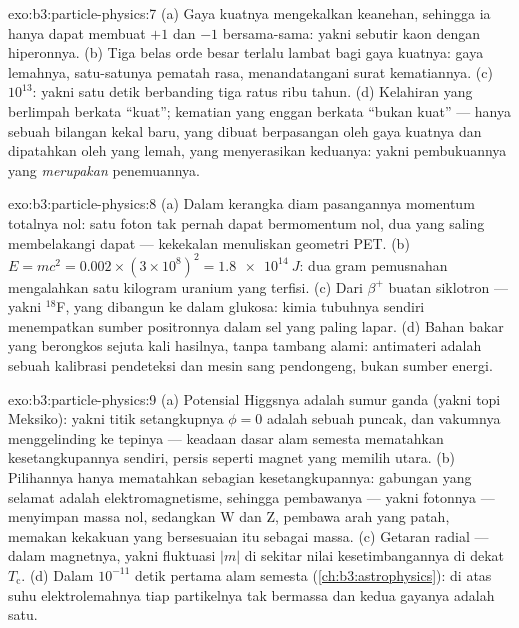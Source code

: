 \begin{solution}{exo:b3:particle-physics:7}
(a) Gaya kuatnya mengekalkan keanehan, sehingga ia hanya dapat membuat
$+1$ dan $-1$ bersama-sama: yakni sebutir kaon dengan hiperonnya. (b) Tiga belas
orde besar terlalu lambat bagi gaya kuatnya: gaya
lemahnya, satu-satunya pematah rasa, menandatangani surat kematiannya.
(c) $10^{13}$: yakni satu detik berbanding tiga ratus ribu tahun.
(d) Kelahiran yang berlimpah berkata ``kuat''; kematian yang enggan berkata ``bukan
kuat'' --- hanya sebuah bilangan kekal baru, yang dibuat berpasangan oleh gaya
kuatnya dan dipatahkan oleh yang lemah, yang menyerasikan keduanya: yakni
pembukuannya yang \emph{merupakan} penemuannya.
\end{solution}

\begin{solution}{exo:b3:particle-physics:8}
(a) Dalam kerangka diam pasangannya momentum totalnya nol: satu
foton tak pernah dapat bermomentum nol, dua yang saling membelakangi dapat ---
kekekalan menuliskan geometri PET. (b) $E = mc^2 =
0.002\times(3\times10^8)^2 = \qty{1.8e14}{J}$: dua gram
pemusnahan mengalahkan satu kilogram uranium yang terfisi. (c) Dari
 $\beta^+$ buatan siklotron --- yakni $^{18}$F, yang dibangun ke dalam
glukosa: kimia tubuhnya sendiri menempatkan sumber positronnya dalam
sel yang paling lapar. (d) Bahan bakar yang berongkos sejuta kali
hasilnya, tanpa tambang alami: antimateri adalah sebuah kalibrasi
pendeteksi dan mesin sang pendongeng, bukan sumber energi.
\end{solution}

\begin{solution}{exo:b3:particle-physics:9}
(a) Potensial Higgsnya adalah sumur ganda (yakni topi Meksiko): yakni
titik setangkupnya $\phi = 0$ adalah sebuah puncak, dan vakumnya menggelinding
ke tepinya --- keadaan dasar alam semesta mematahkan kesetangkupannya
sendiri, persis seperti magnet yang memilih utara. (b) Pilihannya
hanya mematahkan sebagian kesetangkupannya: gabungan yang selamat
adalah elektromagnetisme, sehingga pembawanya --- yakni fotonnya --- menyimpan
massa nol, sedangkan W dan Z, pembawa arah yang patah,
memakan kekakuan yang bersesuaian itu sebagai massa. (c) Getaran radial
 --- dalam magnetnya, yakni
fluktuasi $|m|$ di sekitar nilai kesetimbangannya di dekat
$T_{\text{c}}$. (d) Dalam $10^{-11}$ detik pertama alam
semesta (\cref{ch:b3:astrophysics}): di atas suhu
elektrolemahnya tiap partikelnya tak bermassa dan kedua gayanya
adalah satu.
\end{solution}

